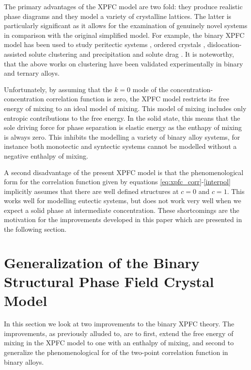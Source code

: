 \documentclass[showkeys, prb, reprint]{revtex4-1}
\begin{document}
The primary advantages of the XPFC model are two fold: they produce realistic
phase diagrams and they model a variety of crystalline lattices. The latter is particularly significant as it allows for the examination of
genuinely novel systems in comparison with the original simplified model. For
example, the binary XPFC model has been used to study peritectic systems
\cite{GREENWOOD11_BINARY}, ordered crystals \cite{ALSTER17},
dislocation-assisted solute clustering and precipitation \cite{FALLAH12,
FALLAH13} and solute drag \cite{GREENWOOD12}. It is noteworthy, that the above
works on clustering have been validated experimentally in binary and ternary
alloys.

Unfortunately, by assuming that the $k=0$ mode of the
concentration-concentration correlation function is zero, the XPFC model
restricts its free energy of mixing to an ideal model of mixing. This model of
mixing includes only entropic contributions to the free energy. In the solid
state, this means that the sole driving force for phase separation is elastic
energy as the enthapy of mixing is always zero. This inhibits the modelling a
variety of binary alloy systems, for instance both monotectic and syntectic
systems cannot be modelled without a negative enthalpy of mixing. 

A second disadvantage of the present XPFC model is that the phenomenological
form for the correlation function given by equations \ref{eq:xpfc_corr}-\ref{interpol}
implicitly assumes that there are well defined structures at $c=0$ and $c=1$.
This works well for modelling eutectic systems, but does not work
very well when we expect a solid phase at intermediate concentration. These
shortcomings are the motivation for the improvements developed in this paper
which are presented in the following section.

\section{Generalization of the Binary Structural Phase Field Crystal Model} %
\label{sec:improvements}

In this section we look at two improvements to the binary XPFC theory. The
improvements, as previously alluded to, are to first, extend the free energy of
mixing in the XPFC model to one with an enthalpy of mixing, and second to generalize the phenomenological for of the two-point correlation function in
binary alloys.
\end{document}
